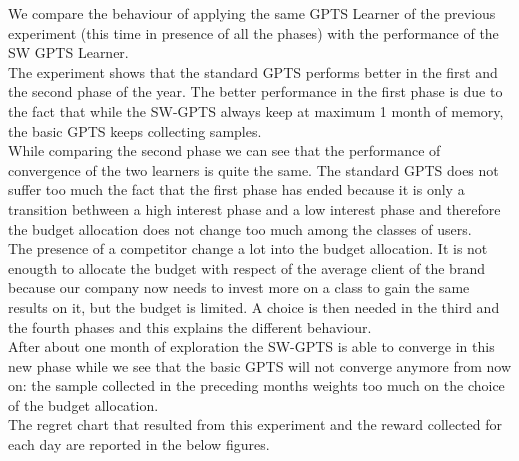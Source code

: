 We compare the behaviour of applying the same GPTS Learner of the previous experiment (this time in presence of all the phases) with the performance of the SW GPTS Learner.
\\The experiment shows that the standard GPTS performs better in the first and the second phase of the year.  The better performance in the first phase is due to the fact that while the SW-GPTS always keep at maximum 1 month of memory, the basic GPTS keeps collecting samples. 
\\While comparing the second phase we can see that the performance of convergence of the two learners is quite the same. The standard GPTS does not suffer too much the fact that the first phase has ended because it is only a transition bethween a high interest phase and a low interest phase and therefore the budget allocation does not change too much among the classes of users.
\\The presence of a competitor change a lot into the budget allocation. It is not enougth to allocate the budget with respect of the average client of the brand because our company now needs to invest more on a class to gain the same results on it, but the budget is limited. A choice is then needed in the third and the fourth phases and this explains the different behaviour. 
\\After about one month of exploration the SW-GPTS is able to converge in this new phase while we see that the basic GPTS will not converge anymore from now on: the sample collected in the preceding months weights too much on the choice of the budget allocation.
\\The regret chart that resulted from this experiment and the reward collected for each day are reported in the below figures.\\
\newpage
{}